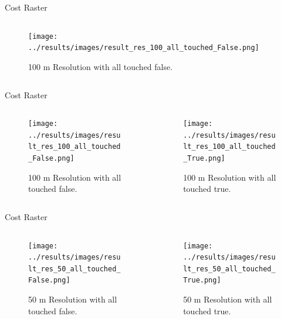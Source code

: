 \documentclass[usenames,dvipsnames,aspectratio=169]{beamer}
\begin{document}
\begin{frame}{Cost Raster}
	\begin{columns}[T] %
		\begin{column}{.48\textwidth}
			\begin{figure}[htb]
				\texttt{[image: ../results/images/result\_res\_100\_all\_touched\_False.png]}
				\caption{100 m Resolution with all touched false.}
			\end{figure}
		\end{column}
		\begin{column}{.48\textwidth}
			
		\end{column}
	\end{columns}
\end{frame}

\begin{frame}{Cost Raster}
	\begin{columns}[T] %
		\begin{column}{.48\textwidth}
			\begin{figure}[htb]
				\texttt{[image: ../results/images/result\_res\_100\_all\_touched\_False.png]}
				\caption{100 m Resolution with all touched false.}
			\end{figure}
		\end{column}
		\begin{column}{.48\textwidth}
			\begin{figure}[htb]
				\texttt{[image: ../results/images/result\_res\_100\_all\_touched\_True.png]}
				\caption{100 m Resolution with all touched true.}
			\end{figure}
		\end{column}
	\end{columns}
\end{frame}

\begin{frame}{Cost Raster}
	\begin{columns}[T] %
		\begin{column}{.48\textwidth}
			\begin{figure}[htb]
				\texttt{[image: ../results/images/result\_res\_50\_all\_touched\_False.png]}
				\caption{50 m Resolution with all touched false.}
			\end{figure}
		\end{column}
		\begin{column}{.48\textwidth}
			\begin{figure}[htb]
				\texttt{[image: ../results/images/result\_res\_50\_all\_touched\_True.png]}
				\caption{50 m Resolution with all touched true.}
			\end{figure}
		\end{column}
	\end{columns}
\end{frame}
\end{document}
